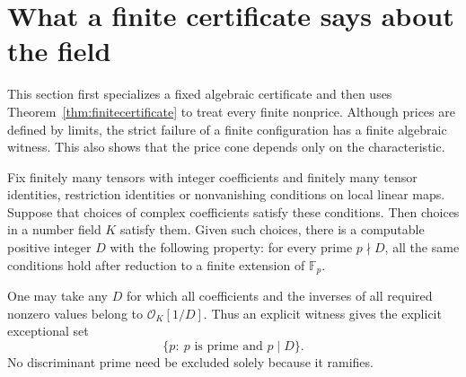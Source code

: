 \section{What a finite certificate says about the field}
\label{sec:field}

This section first specializes a fixed algebraic certificate and
then uses Theorem~\ref{thm:finitecertificate} to treat every finite
nonprice.  Although prices are defined by limits, the strict failure
of a finite configuration has a finite algebraic witness.  This also
shows that the price cone depends only on the characteristic.

\begin{proposition}
\label{prop:finite-specialization}
Fix finitely many tensors with integer coefficients and finitely
many tensor identities, restriction identities or nonvanishing
conditions on local linear maps.  Suppose that choices of complex
coefficients satisfy these conditions.  Then choices in a number
field $K$ satisfy them.  Given such choices, there is a computable
positive integer $D$ with the following property: for every prime
$p\nmid D$, all the same conditions hold after reduction to a
finite extension of $\mathbb F_p$.

One may take any $D$ for which all coefficients and the inverses
of all required nonzero values belong to
$\mathcal O_K[1/D]$.  Thus an explicit witness gives the explicit
exceptional set
\[
 \{p:\ p\text{ is prime and }p\mid D\}.
\]
No discriminant prime need be excluded solely because it ramifies.
\end{proposition}

